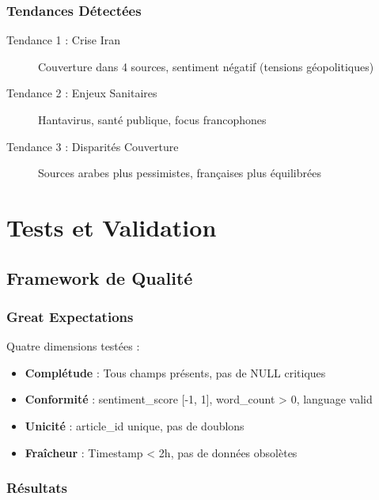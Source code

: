 \documentclass[12pt,a4paper]{report}
\begin{document}
\subsection{Tendances Détectées}

\begin{description}
    \item[Tendance 1 : Crise Iran] Couverture dans 4 sources, sentiment négatif (tensions géopolitiques)
    \item[Tendance 2 : Enjeux Sanitaires] Hantavirus, santé publique, focus francophones
    \item[Tendance 3 : Disparités Couverture] Sources arabes plus pessimistes, françaises plus équilibrées
\end{description}


\chapter{Tests et Validation}

\section{Framework de Qualité}

\subsection{Great Expectations}

Quatre dimensions testées :

\begin{itemize}
    \item \textbf{Complétude} : Tous champs présents, pas de NULL critiques
    \item \textbf{Conformité} : sentiment\_score [-1, 1], word\_count > 0, language valid
    \item \textbf{Unicité} : article\_id unique, pas de doublons
    \item \textbf{Fraîcheur} : Timestamp < 2h, pas de données obsolètes
\end{itemize}

\subsection{Résultats}
\end{document}
